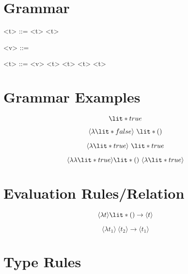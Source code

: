 \documentclass[11hpt]{article}
\begin{document}
\section{Grammar}

\begin{grammar}

<\lambda t> ::= \lit*{() ->} <t>
  \alt \lit*{->} <t>

<v> ::= 
  \alt {}

<t> ::= <v>
  \alt <\lambda t>
  \alt <\lambda t>\lit*{()}
  \alt <\lambda t> <t>
\end{grammar}

\section{Grammar Examples}

\begin{equation}
\lit*{true}
\end{equation}

\begin{equation}
\langle\lambda \lit*{false} \rangle \ \lit*{()}
\end{equation}


\begin{equation}
\langle\lambda \lit*{true} \rangle \ \lit*{true}
\end{equation}

\begin{equation}
\langle\lambda\lambda \lit*{true} \rangle \lit*{()} \ \langle\lambda \lit*{true} \rangle
\end{equation}

\section{Evaluation Rules/Relation}

\begin{equation}
\langle\lambda t\rangle \lit*{()} \rightarrow \langle t \rangle
\end{equation}

\begin{equation}
\langle\lambda t_{1}\rangle \ \langle t_{2} \rangle \rightarrow \langle t_{1} \rangle
\end{equation}

\section{Type Rules}
\end{document}
